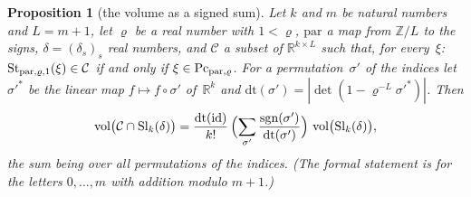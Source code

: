 \documentclass[11pt,a4paper]{article}
\newcommand{\m}[1]{\mbox{$#1$}}        %
\theoremstyle{plainx}
\newtheorem{proposition}[theorem]{Proposition}
\theoremstyle{uprightx}
\newcommand{\RR}{\mathbb{R}}
\newcommand{\cC}{\mathcal{C}}
\newcommand{\ZL}{\mathbb{Z}/L}
\newcommand{\vol}{\operatorname{vol}}
\newcommand{\sgn}{\operatorname{sgn}}
\newcommand{\pa}{\mathrm{par}}          %
\begin{document}
\begin{proposition}[the volume as a signed sum]\label{p:signed}
Let $k$ and $m$ be natural numbers and \m{L=m+1}, let $\varrho$ be a real number with \m{1<\varrho}, $\pa$ a
map from \m{\ZL} to the signs, \m{\delta=(\delta_s)_s} real numbers, and $\cC$ a subset of \m{\RR^{k\times L}} such
that, for every~$\xi$: \m{\permStep{\pa}{\varrho}{1}(\xi)\in\cC} if and only if
\m{\xi\in\pieri{\pa}{\varrho}}. For a permutation~$\sigma'$ of the indices let \m{\sigma'^{*}} be the linear
map \m{f\mapsto f\circ\sigma'} of~\m{\RR^{k}} and
\m{\mathrm{dt}(\sigma')=|\det(1-\varrho^{-L}\sigma'^{*})|}. Then
\[\vol\bigl(\cC\cap\slab{k}{\delta}\bigr)=\frac{\mathrm{dt}(\mathrm{id})}{k!}\,
\Bigl(\sum_{\sigma'}\frac{\sgn(\sigma')}{\mathrm{dt}(\sigma')}\Bigr)\,\vol\bigl(\slab{k}{\delta}\bigr),\]
the sum being over all permutations of the indices. (The formal statement is for the letters \m{0,\dots,m} with
addition modulo \m{m+1}.)
\end{proposition}
\end{document}
